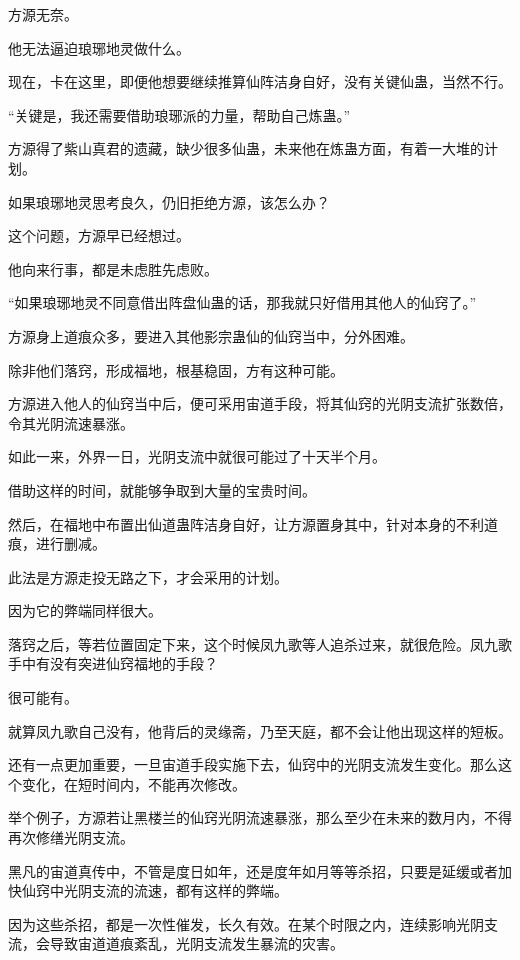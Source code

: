 
\begin{this_body}

方源无奈。

他无法逼迫琅琊地灵做什么。

现在，卡在这里，即便他想要继续推算仙阵洁身自好，没有关键仙蛊，当然不行。

“关键是，我还需要借助琅琊派的力量，帮助自己炼蛊。”

方源得了紫山真君的遗藏，缺少很多仙蛊，未来他在炼蛊方面，有着一大堆的计划。

如果琅琊地灵思考良久，仍旧拒绝方源，该怎么办？

这个问题，方源早已经想过。

他向来行事，都是未虑胜先虑败。

“如果琅琊地灵不同意借出阵盘仙蛊的话，那我就只好借用其他人的仙窍了。”

方源身上道痕众多，要进入其他影宗蛊仙的仙窍当中，分外困难。

除非他们落窍，形成福地，根基稳固，方有这种可能。

方源进入他人的仙窍当中后，便可采用宙道手段，将其仙窍的光阴支流扩张数倍，令其光阴流速暴涨。

如此一来，外界一日，光阴支流中就很可能过了十天半个月。

借助这样的时间，就能够争取到大量的宝贵时间。

然后，在福地中布置出仙道蛊阵洁身自好，让方源置身其中，针对本身的不利道痕，进行删减。

此法是方源走投无路之下，才会采用的计划。

因为它的弊端同样很大。

落窍之后，等若位置固定下来，这个时候凤九歌等人追杀过来，就很危险。凤九歌手中有没有突进仙窍福地的手段？

很可能有。

就算凤九歌自己没有，他背后的灵缘斋，乃至天庭，都不会让他出现这样的短板。

还有一点更加重要，一旦宙道手段实施下去，仙窍中的光阴支流发生变化。那么这个变化，在短时间内，不能再次修改。

举个例子，方源若让黑楼兰的仙窍光阴流速暴涨，那么至少在未来的数月内，不得再次修缮光阴支流。

黑凡的宙道真传中，不管是度日如年，还是度年如月等等杀招，只要是延缓或者加快仙窍中光阴支流的流速，都有这样的弊端。

因为这些杀招，都是一次性催发，长久有效。在某个时限之内，连续影响光阴支流，会导致宙道道痕紊乱，光阴支流发生暴流的灾害。


\end{this_body}
